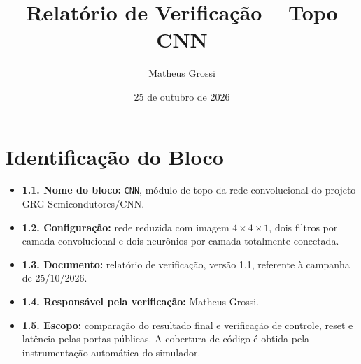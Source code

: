 \documentclass[12pt,a4paper]{article}
\title{Relatório de Verificação -- Topo CNN}
\author{Matheus Grossi}
\date{25 de outubro de 2026}
\begin{document}
\maketitle
\vspace{0.6cm}

\section{Identificação do Bloco}
\begin{itemize}[label=\textbullet]
\item \textbf{1.1. Nome do bloco:} \texttt{CNN}, módulo de topo da rede convolucional do projeto GRG-Semicondutores/CNN.
\item \textbf{1.2. Configuração:} rede reduzida com imagem $4\times4\times1$, dois filtros por camada convolucional e dois neurônios por camada totalmente conectada.
\item \textbf{1.3. Documento:} relatório de verificação, versão 1.1, referente à campanha de 25/10/2026.
\item \textbf{1.4. Responsável pela verificação:} Matheus Grossi.
\item \textbf{1.5. Escopo:} comparação do resultado final e verificação de controle, reset e latência pelas portas públicas. A cobertura de código é obtida pela instrumentação automática do simulador.
\end{itemize}
\end{document}
